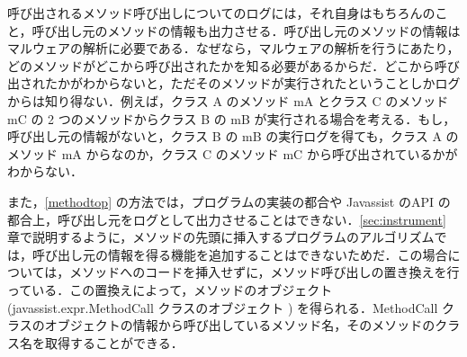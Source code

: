 呼び出されるメソッド呼び出しについてのログには，それ自身はもちろんのこと，呼び出し元のメソッドの情報も出力させる．呼び出し元のメソッドの情報はマルウェアの解析に必要である．なぜなら，マルウェアの解析を行うにあたり，どのメソッドがどこから呼び出されたかを知る必要があるからだ．どこから呼び出されたかがわからないと，ただそのメソッドが実行されたということしかログからは知り得ない．例えば，クラス A のメソッド mA とクラス C のメソッド mC の 2 つのメソッドからクラス B の mB が実行される場合を考える．もし，呼び出し元の情報がないと，クラス B の mB の実行ログを得ても，クラス A のメソッド mA からなのか，クラス C のメソッド mC から呼び出されているかがわからない．

また，\ref{methodtop} の方法では，プログラムの実装の都合や Javassist のAPI の都合上，呼び出し元をログとして出力させることはできない．\ref{sec:instrument} 章で説明するように，メソッドの先頭に挿入するプログラムのアルゴリズムでは，呼び出し元の情報を得る機能を追加することはできないためだ．この場合については，メソッドへのコードを挿入せずに，メソッド呼び出しの置き換えを行っている．この置換えによって，メソッドのオブジェクト(javassist.expr.MethodCall クラスのオブジェクト ) を得られる．MethodCall クラスのオブジェクトの情報から呼び出しているメソッド名，そのメソッドのクラス名を取得することができる．

